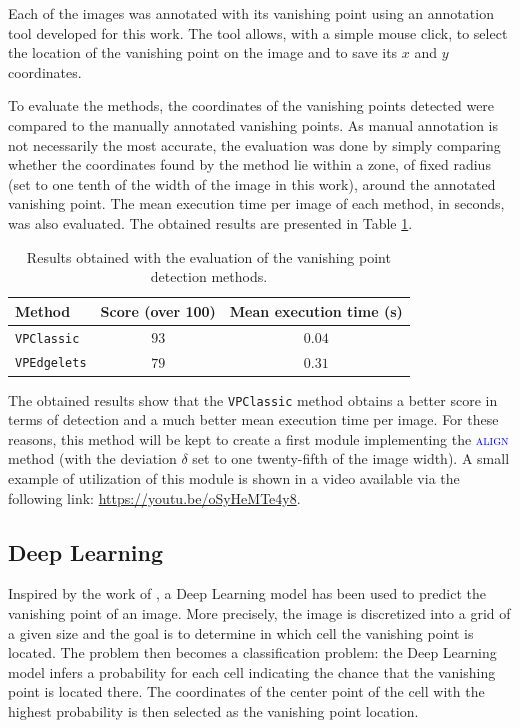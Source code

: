 Each of the images was annotated with its vanishing point using an annotation tool developed for this work. The tool allows, with a simple mouse click, to select the location of the vanishing point on the image and to save its $x$ and $y$ coordinates.

To evaluate the methods, the coordinates of the vanishing points detected were compared to the manually annotated vanishing points. As manual annotation is not necessarily the most accurate, the evaluation was done by simply comparing whether the coordinates found by the method lie within a zone, of fixed radius (set to one tenth of the width of the image in this work), around the annotated vanishing point. The mean execution time per image of each method, in seconds, was also evaluated. The obtained results are presented in Table \ref{tab:06.vanishing.point.evaluation.results}.

\begin{table}[H]
    \centering
    \begin{tabular}{|l|c|c|}
        \hline
        \textbf{Method} & \textbf{Score} (over 100) & \textbf{Mean execution time} (s) \\ \hline
        \hline
        \texttt{VPClassic} & $\num{93}$ & $\num{0.04}$ \\ \hline
        \texttt{VPEdgelets} & $\num{79}$ & $\num{0.31}$ \\ \hline
    \end{tabular}
    \caption{Results obtained with the evaluation of the vanishing point detection methods.}
    \label{tab:06.vanishing.point.evaluation.results}
\end{table}

The obtained results show that the \texttt{VPClassic} method obtains a better score in terms of detection and a much better mean execution time per image. For these reasons, this method will be kept to create a first module implementing the \textsc{\textcolor{blue}{align}} method (with the deviation $\delta$ set to one twenty-fifth of the image width). A small example of utilization of this module is shown in a video available via the following link: \url{https://youtu.be/oSyHeMTe4y8}.

\subsection{Deep Learning}

Inspired by the work of \textcite{chang2018deepvp}, a Deep Learning model has been used to predict the vanishing point of an image. More precisely, the image is discretized into a grid of a given size and the goal is to determine in which cell the vanishing point is located. The problem then becomes a classification problem: the Deep Learning model infers a probability for each cell indicating the chance that the vanishing point is located there. The coordinates of the center point of the cell with the highest probability is then selected as the vanishing point location.

